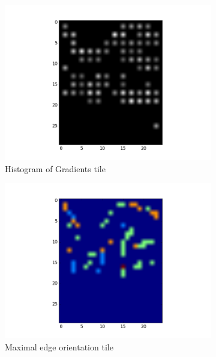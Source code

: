 \documentclass[fleqn,10pt]{SelfArx} %
\begin{document}
\begin{figure}
        \begin{subfigure}[b]{0.3\textwidth}
                \includegraphics[width=\linewidth]{Figures/EdgeFigures/TileHOG.png}
                \caption{Histogram of Gradients tile}
                \label{fig:HOGTile}
        \end{subfigure}
        \begin{subfigure}[b]{0.3\textwidth}
                \includegraphics[width=\linewidth]{Figures/EdgeFigures/TileEdgeOrient.png}
                \caption{Maximal edge orientation tile}
                \label{fig:EdgeOrientTile}
        \end{subfigure}
        \begin{subfigure}[b]{0.3\textwidth}

\end{subfigure}
\end{figure}
\end{document}
